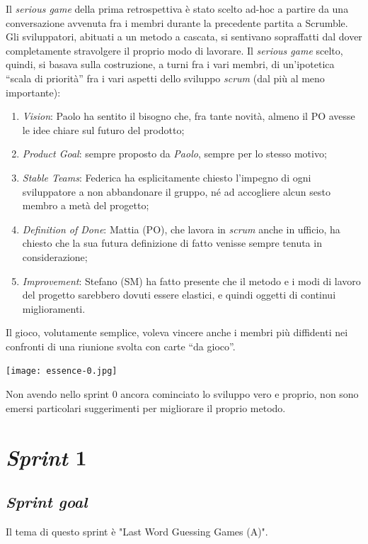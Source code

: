 \documentclass{article}
\begin{document}
Il \emph{serious game} della prima retrospettiva è stato scelto ad-hoc a partire
da una conversazione avvenuta fra i membri durante la precedente partita a
Scrumble. Gli sviluppatori, abituati a un metodo a cascata, si sentivano
sopraffatti dal dover completamente stravolgere il proprio modo di lavorare.
Il \emph{serious game} scelto, quindi, si basava sulla costruzione, a turni fra
i vari membri, di un'ipotetica ``scala di priorità'' fra i vari aspetti dello
sviluppo \emph{scrum} (dal più al meno importante):
\begin{enumerate}
	\item \emph{Vision}: Paolo ha sentito il bisogno che, fra tante novità, almeno
	      il PO avesse le idee chiare sul futuro del prodotto;
	\item \emph{Product Goal}: sempre proposto da \emph{Paolo}, sempre per lo
	      stesso motivo;
	\item \emph{Stable Teams}: Federica ha esplicitamente chiesto l'impegno di
	      ogni sviluppatore a non abbandonare il gruppo, né ad accogliere alcun sesto
	      membro a metà del progetto;
	\item \emph{Definition of Done}: Mattia (PO), che lavora in \emph{scrum} anche
	      in ufficio, ha chiesto che la sua futura definizione di fatto venisse sempre
	      tenuta in considerazione;
	\item \emph{Improvement}: Stefano (SM) ha fatto presente che il metodo e i
	      modi di lavoro del progetto sarebbero dovuti essere elastici, e quindi
	      oggetti di continui miglioramenti.
\end{enumerate}
Il gioco, volutamente semplice, voleva vincere anche i membri più diffidenti nei
confronti di una riunione svolta con carte ``da gioco''.

\texttt{[image: essence-0.jpg]}

Non avendo nello sprint 0 ancora cominciato lo sviluppo vero e proprio, non sono
emersi particolari suggerimenti per migliorare il proprio metodo.

\section{\emph{Sprint} 1}

\subsection{\emph{Sprint goal}}

Il tema di questo sprint è "Last Word Guessing Games (A)".
\end{document}

